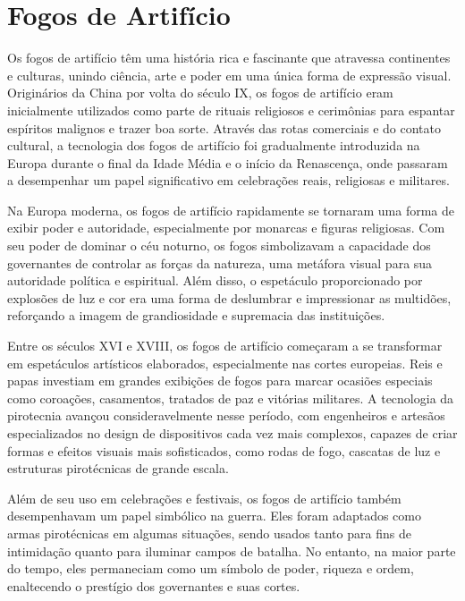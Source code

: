 \chapter{Fogos de Artifício}

\fontsize{12}{14}\selectfont


Os fogos de artifício têm uma história rica e fascinante que atravessa continentes e culturas, unindo ciência, arte e poder em uma única forma de expressão visual. Originários da China por volta do século IX, os fogos de artifício eram inicialmente utilizados como parte de rituais religiosos e cerimônias para espantar espíritos malignos e trazer boa sorte. Através das rotas comerciais e do contato cultural, a tecnologia dos fogos de artifício foi gradualmente introduzida na Europa durante o final da Idade Média e o início da Renascença, onde passaram a desempenhar um papel significativo em celebrações reais, religiosas e militares.

Na Europa moderna, os fogos de artifício rapidamente se tornaram uma forma de exibir poder e autoridade, especialmente por monarcas e figuras religiosas. Com seu poder de dominar o céu noturno, os fogos simbolizavam a capacidade dos governantes de controlar as forças da natureza, uma metáfora visual para sua autoridade política e espiritual. Além disso, o espetáculo proporcionado por explosões de luz e cor era uma forma de deslumbrar e impressionar as multidões, reforçando a imagem de grandiosidade e supremacia das instituições.

Entre os séculos XVI e XVIII, os fogos de artifício começaram a se transformar em espetáculos artísticos elaborados, especialmente nas cortes europeias. Reis e papas investiam em grandes exibições de fogos para marcar ocasiões especiais como coroações, casamentos, tratados de paz e vitórias militares. A tecnologia da pirotecnia avançou consideravelmente nesse período, com engenheiros e artesãos especializados no design de dispositivos cada vez mais complexos, capazes de criar formas e efeitos visuais mais sofisticados, como rodas de fogo, cascatas de luz e estruturas pirotécnicas de grande escala.

Além de seu uso em celebrações e festivais, os fogos de artifício também desempenhavam um papel simbólico na guerra. Eles foram adaptados como armas pirotécnicas em algumas situações, sendo usados tanto para fins de intimidação quanto para iluminar campos de batalha. No entanto, na maior parte do tempo, eles permaneciam como um símbolo de poder, riqueza e ordem, enaltecendo o prestígio dos governantes e suas cortes.

